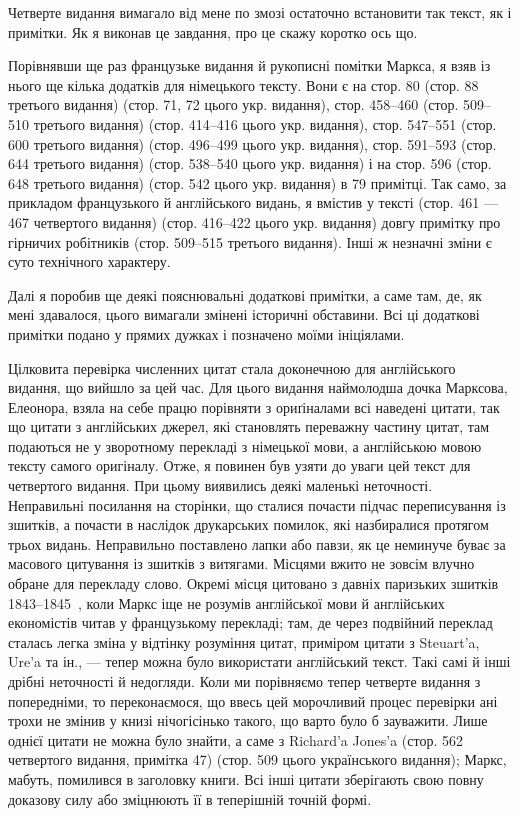 Четверте видання вимагало від мене по змозі остаточно встановити
так текст, як і примітки. Як я виконав це завдання, про
це скажу коротко ось що.

Порівнявши ще раз французьке видання й рукописні помітки
Маркса, я взяв із нього ще кілька додатків для німецького тексту.
Вони є на стор. 80 (стор. 88 третього видання) (стор. 71, 72 цього
укр. видання), стор. 458--460 (стор. 509--510 третього видання)
(стор. 414--416 цього укр. видання), стор. 547--551 (стор. 600
третього видання) (стор. 496--499 цього укр. видання), стор.
591--593 (стор. 644 третього видання) (стор. 538--540 цього укр.
видання) і на стор. 596 (стор. 648 третього видання) (стор. 542
цього укр. видання) в 79 примітці. Так само, за прикладом французького
й англійського видань, я вмістив у тексті (стор. 461 —
467 четвертого видання) (стор. 416--422 цього укр. видання)
довгу примітку про гірничих робітників (стор. 509--515 третього
видання). Інші ж незначні зміни є суто технічного характеру.

Далі я поробив ще деякі пояснювальні додаткові примітки,
а саме там, де, як мені здавалося, цього вимагали змінені історичні
обставини. Всі ці додаткові примітки подано у прямих дужках
і позначено моїми ініціялами.

Цілковита перевірка численних цитат стала доконечною для
англійського видання, що вийшло за цей час. Для цього видання
наймолодша дочка Марксова, Елеонора, взяла на себе працю
порівняти з ориґіналами всі наведені цитати, так що цитати
з англійських джерел, які становлять переважну частину цитат,
там подаються не у зворотному перекладі з німецької мови, а
англійською мовою тексту самого оригіналу. Отже, я повинен був
узяти до уваги цей текст для четвертого видання. При цьому виявились
деякі маленькі неточності. Неправильні посилання на сторінки,
що сталися почасти підчас переписування із зшитків, а почасти
в наслідок друкарських помилок, які назбиралися протягом
трьох видань. Неправильно поставлено лапки або павзи, як це
неминуче буває за масового цитування із зшитків з витягами.
Місцями вжито не зовсім влучно обране для перекладу слово.
Окремі місця цитовано з давніх паризьких зшитків 1843--1845~,
коли Маркс іще не розумів англійської мови й англійських економістів
читав у французькому перекладі; там, де через подвійний
переклад сталась легка зміна у відтінку розуміння цитат, приміром
цитати з Steuart’a, Ure’a та ін., — тепер можна було використати
англійський текст. Такі самі й інші дрібні неточності й недогляди.
Коли ми порівняємо тепер четверте видання з попередніми, то
переконаємося, що ввесь цей морочливий процес перевірки ані
трохи не змінив у книзі нічогісінько такого, що варто було б
зауважити. Лише однієї цитати не можна було знайти, а саме
з Richard’a Jones’a (стор. 562 четвертого видання, примітка 47)
(стор. 509 цього українського видання); Маркс, мабуть, помилився
в заголовку книги. Всі інші цитати зберігають свою повну
доказову силу або зміцнюють її в теперішній точній формі.

